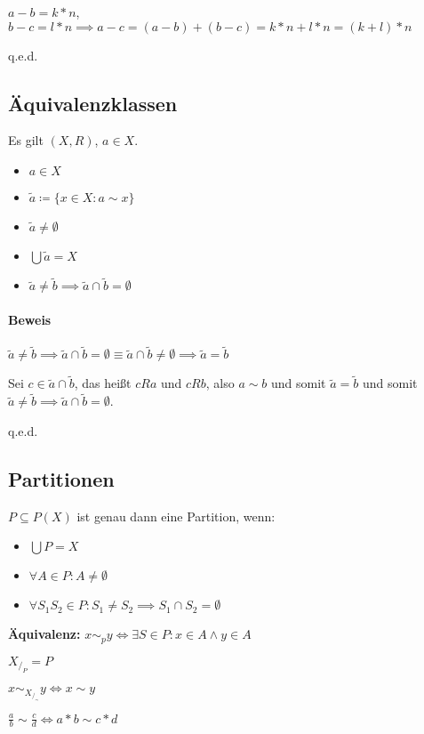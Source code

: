 \documentclass[12pt]{scrreprt}
\newcommand{\qed}{\begin{flushright}q.e.d.\end{flushright}}
\begin{document}
                    $ a - b = k * n $, $ b - c = l * n \implies a - c = (a - b) + (b - c) = k * n + l * n = (k + l) * n $

                    \qed


            \subsection{Äquivalenzklassen}
                \label{ss:grundbegriffe_mengen_aequivalenzklassen}

                Es gilt $ (X, R) $, $ a \in X $.

                \begin{itemize}
                    \item $ a \in X $
                    \item $ \tilde{a} \coloneqq \{ x \in X : a \sim x \} $
                    \item $ \tilde{a} \neq \emptyset $
                    \item $ \bigcup \tilde{a} = X $
                    \item $ \tilde{a} \neq \tilde{b} \implies \tilde{a} \cap \tilde{b} = \emptyset $
                \end{itemize}

                \paragraph{Beweis}
                    $ \tilde{a} \neq \tilde{b} \implies \tilde{a} \cap \tilde{b} = \emptyset \equiv \tilde{a} \cap \tilde{b} \neq \emptyset \implies \tilde{a} = \tilde{b} $

                    Sei $ c \in \tilde{a} \cap \tilde{b} $, das heißt $ cRa $ und $ cRb $, also $ a \sim b $ und somit $ \tilde{a} = \tilde{b} $ und somit $ \tilde{a} \neq \tilde{b} \implies \tilde{a} \cap \tilde{b} = \emptyset $.

                    \qed


            \subsection{Partitionen}
                \label{ss:grundbegriffe_mengen_partitionen}

                $ P \subseteq P(X) $ ist genau dann eine Partition, wenn:
                \begin{itemize}
                    \item $ \bigcup P = X $
                    \item $ \forall A \in P : A \neq \emptyset $
                    \item $ \forall S _ 1 S _ 2 \in P : S _ 1 \neq S _ 2 \implies S _ 1 \cap S _ 2 = \emptyset $
                \end{itemize}

                \textbf{Äquivalenz:} $ x \sim _ p y \iff \exists S \in P : x \in A \land y \in A $

                $ X _ { / _ { P } } = P $

                $ x \sim _ { X _ { / _ { \sim } } } y \iff x \sim y $

                $ \frac{a}{b} \sim \frac{c}{d} \iff a * b \sim c * d $
\end{document}
